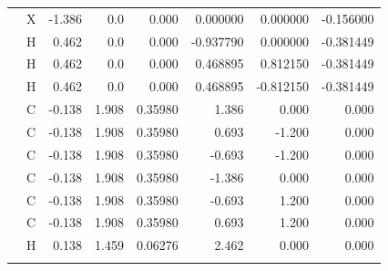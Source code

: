 \begin{table}[H]
\begin{centering}
\begin{tabular*}{1\linewidth}{@{\extracolsep{\fill}}llrrrrrr}
\addlinespace[-0.17em]
\addlinespace[-0.33em]
 & {\scriptsize{}X} & {\scriptsize{}-1.386} & {\scriptsize{}0.0} & {\scriptsize{}0.000} & {\scriptsize{}0.000000} & {\scriptsize{}0.000000} & {\scriptsize{}-0.156000}\tabularnewline
\addlinespace[-0.17em]
\addlinespace[-0.33em]
 & {\scriptsize{}H} & {\scriptsize{}0.462} & {\scriptsize{}0.0} & {\scriptsize{}0.000} & {\scriptsize{}-0.937790} & {\scriptsize{}0.000000} & {\scriptsize{}-0.381449}\tabularnewline
\addlinespace[-0.17em]
\addlinespace[-0.33em]
 & {\scriptsize{}H} & {\scriptsize{}0.462} & {\scriptsize{}0.0} & {\scriptsize{}0.000} & {\scriptsize{}0.468895} & {\scriptsize{}0.812150} & {\scriptsize{}-0.381449}\tabularnewline
\addlinespace[-0.17em]
\addlinespace[-0.33em]
 & {\scriptsize{}H} & {\scriptsize{}0.462} & {\scriptsize{}0.0} & {\scriptsize{}0.000} & {\scriptsize{}0.468895} & {\scriptsize{}-0.812150} & {\scriptsize{}-0.381449}\tabularnewline
\addlinespace[-0.17em]
\midrule 
\addlinespace[-0.33em]
{\scriptsize{}Benzene \citep{Chipot_1996}} & {\scriptsize{}C} & {\scriptsize{}-0.138} & {\scriptsize{}1.908 } & {\scriptsize{}0.35980 } & {\scriptsize{}1.386 } & {\scriptsize{}0.000} & {\scriptsize{}0.000}\tabularnewline
\addlinespace[-0.17em]
\addlinespace[-0.33em]
{\scriptsize{}(charged)} & {\scriptsize{}C} & {\scriptsize{}-0.138} & {\scriptsize{}1.908 } & {\scriptsize{}0.35980 } & {\scriptsize{}0.693} & {\scriptsize{}-1.200} & {\scriptsize{}0.000}\tabularnewline
\addlinespace[-0.17em]
\addlinespace[-0.33em]
 & {\scriptsize{}C} & {\scriptsize{}-0.138} & {\scriptsize{}1.908 } & {\scriptsize{}0.35980 } & {\scriptsize{}-0.693} & {\scriptsize{}-1.200} & {\scriptsize{}0.000}\tabularnewline
\addlinespace[-0.17em]
\addlinespace[-0.33em]
 & {\scriptsize{}C} & {\scriptsize{}-0.138} & {\scriptsize{}1.908 } & {\scriptsize{}0.35980 } & {\scriptsize{}-1.386} & {\scriptsize{}0.000} & {\scriptsize{}0.000}\tabularnewline
\addlinespace[-0.17em]
\addlinespace[-0.33em]
 & {\scriptsize{}C} & {\scriptsize{}-0.138} & {\scriptsize{}1.908 } & {\scriptsize{}0.35980 } & {\scriptsize{}-0.693} & {\scriptsize{}1.200} & {\scriptsize{}0.000}\tabularnewline
\addlinespace[-0.17em]
\addlinespace[-0.33em]
 & {\scriptsize{}C} & {\scriptsize{}-0.138} & {\scriptsize{}1.908 } & {\scriptsize{}0.35980 } & {\scriptsize{}0.693} & {\scriptsize{}1.200} & {\scriptsize{}0.000}\tabularnewline
\addlinespace[-0.17em]
\addlinespace[-0.33em]
 & {\scriptsize{}H} & {\scriptsize{}0.138 } & {\scriptsize{}1.459} & {\scriptsize{}0.06276 } & {\scriptsize{}2.462} & {\scriptsize{}0.000} & {\scriptsize{}0.000}\tabularnewline
\addlinespace[-0.17em]
\addlinespace[-0.33em]

\end{tabular*}
\end{centering}
\end{table}
